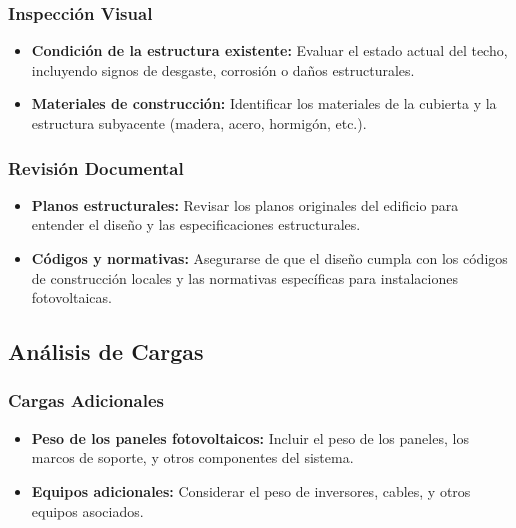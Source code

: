 \documentclass[a4paper,12pt]{article}
\begin{document}
\begin{Form}
\subsubsection*{Inspección Visual}
\begin{itemize}
    \item \textbf{Condición de la estructura existente:} Evaluar el estado actual del techo, incluyendo signos de desgaste, corrosión o daños estructurales.
    \item \textbf{Materiales de construcción:} Identificar los materiales de la cubierta y la estructura subyacente (madera, acero, hormigón, etc.).
\end{itemize}

\subsubsection*{Revisión Documental}
\begin{itemize}
    \item \textbf{Planos estructurales:} Revisar los planos originales del edificio para entender el diseño y las especificaciones estructurales.
    \item \textbf{Códigos y normativas:} Asegurarse de que el diseño cumpla con los códigos de construcción locales y las normativas específicas para instalaciones fotovoltaicas.
\end{itemize}

\subsection*{Análisis de Cargas}

\subsubsection*{Cargas Adicionales}
\begin{itemize}
    \item \textbf{Peso de los paneles fotovoltaicos:} Incluir el peso de los paneles, los marcos de soporte, y otros componentes del sistema.
    \item \textbf{Equipos adicionales:} Considerar el peso de inversores, cables, y otros equipos asociados.
\end{itemize}


\end{Form}
\end{document}
